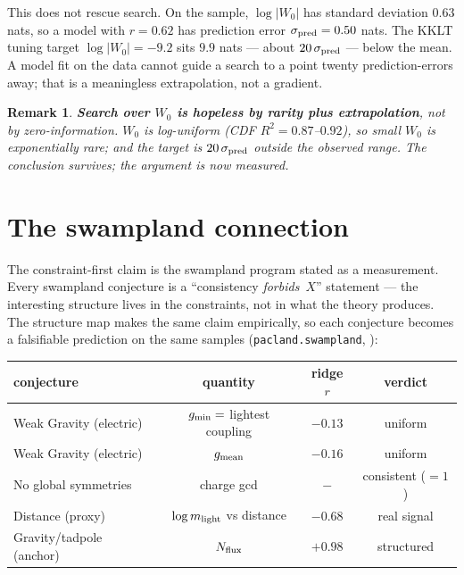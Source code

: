 \documentclass[11pt]{article}
\newtheorem{remark}{Remark}
\begin{document}
This does not rescue search. On the sample, $\log|W_0|$ has standard deviation
$0.63$ nats, so a model with $r=0.62$ has prediction error $\sigma_{\rm pred}=0.50$
nats. The KKLT tuning target $\log|W_0|=-9.2$ sits $9.9$ nats --- about
$20\,\sigma_{\rm pred}$ --- below the mean. A model fit on the data cannot guide a
search to a point twenty prediction-errors away; that is a meaningless
extrapolation, not a gradient.

\begin{remark}
\textbf{Search over $W_0$ is hopeless by rarity plus extrapolation}, not by
zero-information. $W_0$ is log-uniform (CDF $R^2=0.87$--$0.92$), so small $W_0$ is
exponentially rare; and the target is $20\,\sigma_{\rm pred}$ outside the observed
range. The conclusion survives; the argument is now measured.
\end{remark}

\section{The swampland connection}

The constraint-first claim is the swampland program stated as a measurement. Every
swampland conjecture is a ``consistency \emph{forbids}~$X$'' statement --- the
interesting structure lives in the constraints, not in what the theory produces.
The structure map makes the same claim empirically, so each conjecture becomes a
falsifiable prediction on the same samples (\texttt{pacland.swampland},
\cite{swampland-review}):

\begin{center}
\begin{tabular}{lccc}
\hline
conjecture & quantity & ridge $r$ & verdict \\
\hline
Weak Gravity (electric) & $g_{\rm min}=$ lightest coupling & $-0.13$ & uniform \\
Weak Gravity (electric) & $g_{\rm mean}$ & $-0.16$ & uniform \\
No global symmetries & charge gcd & $-$ & consistent ($=1$) \\
Distance (proxy) & $\log m_{\rm light}$ vs distance & $-0.68$ & real signal \\
Gravity/tadpole (anchor) & $N_{\rm flux}$ & $+0.98$ & structured \\
\hline
\end{tabular}
\end{center}
\end{document}
